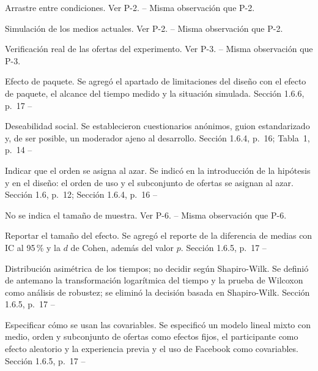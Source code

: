 \documentclass[10pt]{article}
\begin{document}
\begin{matriz}
  {Arrastre entre condiciones.}
  {Ver P-2.}
  {--}
  {\Atendida}{Misma observación que P-2.}{}

  {Simulación de los medios actuales.}
  {Ver P-2.}
  {--}
  {\Atendida}{Misma observación que P-2.}{}

  {Verificación real de las ofertas del experimento.}
  {Ver P-3.}
  {--}
  {\Atendida}{Misma observación que P-3.}{}

  {Efecto de paquete.}
  {Se agregó el apartado de limitaciones del diseño con el efecto de paquete, el alcance del tiempo medido y la situación simulada.}
  {Sección 1.6.6, p.~17}
  {\Atendida}{--}{}

  {Deseabilidad social.}
  {Se establecieron cuestionarios anónimos, guion estandarizado y, de ser posible, un moderador ajeno al desarrollo.}
  {Sección 1.6.4, p.~16; Tabla~1, p.~14}
  {\Atendida}{--}{}

  {Indicar que el orden se asigna al azar.}
  {Se indicó en la introducción de la hipótesis y en el diseño: el orden de uso y el subconjunto de ofertas se asignan al azar.}
  {Sección 1.6, p.~12; Sección 1.6.4, p.~16}
  {\Atendida}{--}{}

  {No se indica el tamaño de muestra.}
  {Ver P-6.}
  {--}
  {\Atendida}{Misma observación que P-6.}{}

  {Reportar el tamaño del efecto.}
  {Se agregó el reporte de la diferencia de medias con IC al 95\,\% y la $d$ de Cohen, además del valor $p$.}
  {Sección 1.6.5, p.~17}
  {\Atendida}{--}{}

  {Distribución asimétrica de los tiempos; no decidir según Shapiro-Wilk.}
  {Se definió de antemano la transformación logarítmica del tiempo y la prueba de Wilcoxon como análisis de robustez; se eliminó la decisión basada en Shapiro-Wilk.}
  {Sección 1.6.5, p.~17}
  {\Atendida}{--}{}

  {Especificar cómo se usan las covariables.}
  {Se especificó un modelo lineal mixto con medio, orden y subconjunto de ofertas como efectos fijos, el participante como efecto aleatorio y la experiencia previa y el uso de Facebook como covariables.}
  {Sección 1.6.5, p.~17}
  {\Atendida}{--}{}


\end{matriz}
\end{document}
